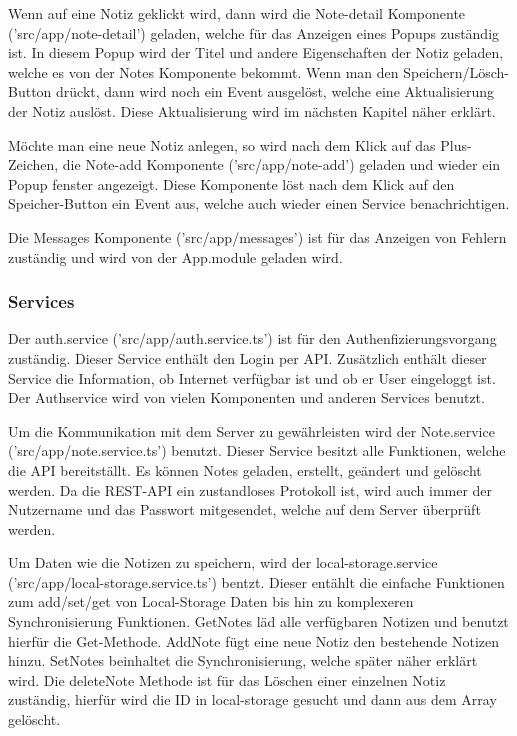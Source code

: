\documentclass[12pt]{article}
\begin{document}
Wenn auf eine Notiz geklickt wird, dann wird die Note-detail Komponente ('src/app/note-detail') geladen, welche für das Anzeigen eines Popups zuständig ist. In diesem Popup wird der Titel und andere Eigenschaften der Notiz geladen, welche es von der Notes Komponente bekommt. Wenn man den Speichern/Lösch-Button drückt, dann wird noch ein Event ausgelöst, welche eine Aktualisierung der Notiz auslöst. Diese Aktualisierung wird im nächsten Kapitel näher erklärt. 

Möchte man eine neue Notiz anlegen, so wird nach dem Klick auf das Plus-Zeichen, die Note-add Komponente ('src/app/note-add') geladen und wieder ein Popup fenster angezeigt. Diese Komponente löst nach dem Klick auf den Speicher-Button ein Event aus, welche auch wieder einen Service benachrichtigen. 

Die Messages Komponente ('src/app/messages') ist für das Anzeigen von Fehlern zuständig und wird von der App.module geladen wird.
        
            \subsubsection{Services}

Der auth.service ('src/app/auth.service.ts') ist für den Authenfizierungsvorgang zuständig. Dieser Service enthält den Login per API. Zusätzlich enthält dieser Service die Information, ob Internet verfügbar ist und ob er User eingeloggt ist. Der Authservice wird von vielen Komponenten und anderen Services benutzt. 

Um die Kommunikation mit dem Server zu gewährleisten wird der Note.service ('src/app/note.service.ts') benutzt. Dieser Service besitzt alle Funktionen, welche die API bereitställt. Es können Notes geladen, erstellt, geändert und gelöscht werden. Da die REST-API ein zustandloses Protokoll ist, wird auch immer der Nutzername und das Passwort mitgesendet, welche auf dem Server überprüft werden. 

Um Daten wie die Notizen zu speichern, wird der local-storage.service ('src/app/local-storage.service.ts') bentzt. Dieser entählt die einfache Funktionen zum add/set/get von Local-Storage Daten bis hin zu komplexeren Synchronisierung Funktionen. GetNotes läd alle verfügbaren Notizen und benutzt hierfür die Get-Methode. AddNote fügt eine neue Notiz den bestehende Notizen hinzu. SetNotes beinhaltet die Synchronisierung, welche später näher erklärt wird. Die deleteNote Methode ist für das Löschen einer einzelnen Notiz zuständig, hierfür wird die ID in local-storage gesucht und dann aus dem Array gelöscht.
\end{document}
